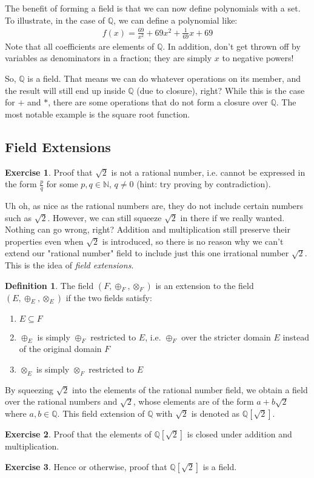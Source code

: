 \documentclass[12pt]{article}
\theoremstyle{definition}
\newtheorem{defn}{Definition}[section]
\newtheorem{ex}{Exercise}[section]
\newcommand{\QQ}{\mathbb{Q}}
\newcommand{\NN}{\mathbb{N}}
\begin{document}
	The benefit of forming a field is that we can now define polynomials with a set. To illustrate, in the case of $\QQ$, we can define a polynomial like:
	\begin{gather*}
		f(x) = \frac{69}{x^2} + 69x^2 + \frac{1}{69}x + 69
	\end{gather*}
	Note that all coefficients are elements of $\QQ$. In addition, don't get thrown off by variables as denominators in a fraction; they are simply $x$ to negative powers!
	
	So, $\QQ$ is a field. That means we can do whatever operations on its member, and the result will still end up inside $\QQ$ (due to closure), right? While this is the case for $+$ and $*$, there are some operations that do not form a closure over $\QQ$. The most notable example is the square root function.
	
	\subsection{Field Extensions}
	
	\begin{ex}
		Proof that $\sqrt{2}$ is not a rational number, i.e. cannot be expressed in the form $\frac{p}{q}$ for some $p, q \in \NN$, $q \neq 0$ (hint: try proving by contradiction).
	\end{ex}
	
	Uh oh, as nice as the rational numbers are, they do not include certain numbers such as $\sqrt{2}$. However, we can still squeeze $\sqrt{2}$ in there if we really wanted. Nothing can go wrong, right? Addition and multiplication still preserve their properties even when $\sqrt{2}$ is introduced, so there is no reason why we can't extend our "rational number" field to include just this one irrational number $\sqrt{2}$. This is the idea of \emph{field extensions}.
	
	\begin{defn}
		The field $(F, \oplus_F, \otimes_F)$ is an extension to the field $(E, \oplus_E, \otimes_E)$ if the two fields satisfy:
		\begin{enumerate}
			\item $E \subseteq F$
			\item $\oplus_E$ is simply $\oplus_F$ restricted to $E$, i.e. $\oplus_F$ over the stricter domain $E$ instead of the original domain $F$
			\item $\otimes_E$ is simply $\otimes_F$ restricted to $E$
		\end{enumerate}
	\end{defn}
	
	By squeezing $\sqrt{2}$ into the elements of the rational number field, we obtain a field over the rational numbers and $\sqrt{2}$, whose elements are of the form $a + b\sqrt{2}$ where $a, b \in \QQ$. This field extension of $\QQ$ with $\sqrt{2}$ is denoted as $\QQ[\sqrt{2}]$.
	
	\begin{ex}
		Proof that the elements of $\QQ[\sqrt{2}]$ is closed under addition and multiplication.
	\end{ex}
	
	\begin{ex}
		Hence or otherwise, proof that $\QQ[\sqrt{2}]$ is a field.
	\end{ex}
	
\end{document}
